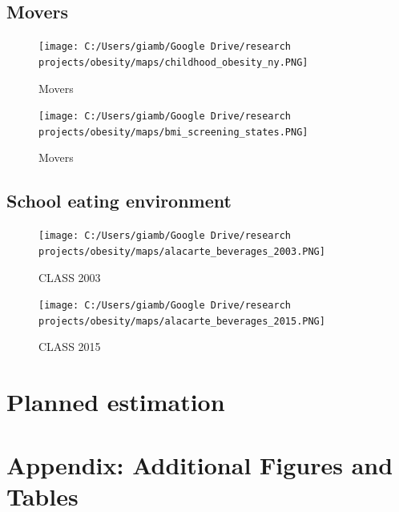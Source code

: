 \documentclass[twoside,12pt]{article}
\renewcommand{\thesection}{\Roman{section}}
\renewcommand{\thesubsection}{\thesection.\Alph{subsection}}
\begin{document}
\subsection{Movers}
\begin{figure}[htp]
  \centering
  \label{homestrend}\caption{Movers}
  \texttt{[image: C:/Users/giamb/Google Drive/research projects/obesity/maps/childhood\_obesity\_ny.PNG]}
\end{figure}

\begin{figure}[htp]
  \centering
  \label{homestrend}\caption{Movers}
  \texttt{[image: C:/Users/giamb/Google Drive/research projects/obesity/maps/bmi\_screening\_states.PNG]}
\end{figure}

\subsection{School eating environment}
\begin{figure}[htp]
  \centering
  \label{homestrend}\caption{CLASS 2003}
  \texttt{[image: C:/Users/giamb/Google Drive/research projects/obesity/maps/alacarte\_beverages\_2003.PNG]}
\end{figure}

\begin{figure}[htp]
  \centering
  \label{homestrend}\caption{CLASS 2015}
  \texttt{[image: C:/Users/giamb/Google Drive/research projects/obesity/maps/alacarte\_beverages\_2015.PNG]}
\end{figure}

\section{Planned estimation}


\newpage


\newpage
\section*{Appendix: Additional Figures and Tables}
\renewcommand{\thetable}{A.\arabic{table}}
\setcounter{table}{0}
\renewcommand{\thefigure}{A.\arabic{figure}}
\setcounter{figure}{0}
\renewcommand{\theequation}{A.\arabic{equation}}
\setcounter{equation}{0}
\renewcommand{\thesubsection}{A.\arabic{subsection}}
\setcounter{subsection}{0}
\end{document}
